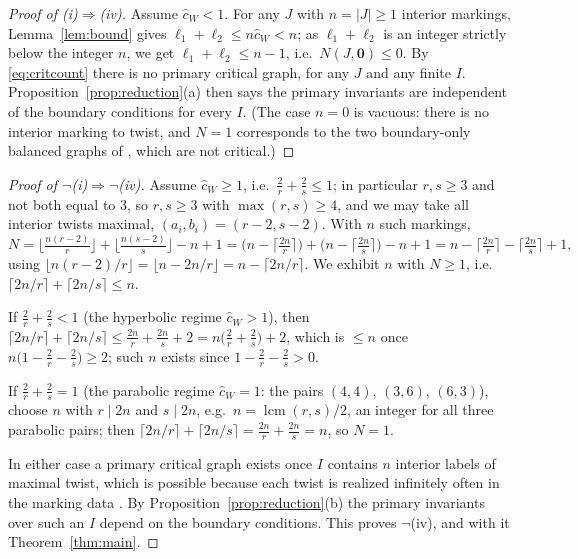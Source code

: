 \documentclass[11pt]{amsart}
\theoremstyle{definition}
\theoremstyle{remark}
\newcommand{\chat}{\hat{c}}
\begin{document}
\begin{proof}[Proof of (i)$\Rightarrow$(iv)]
Assume $\chat_{W}<1$. For any $J$ with $n=|J|\geq1$ interior markings,
Lemma~\ref{lem:bound} gives $\ell_{1}+\ell_{2}\leq n\chat_{W}<n$; as
$\ell_{1}+\ell_{2}$ is an integer strictly below the integer $n$, we get
$\ell_{1}+\ell_{2}\leq n-1$, i.e.\ $N(J,\mathbf 0)\leq0$. By
\eqref{eq:critcount} there is no primary critical graph, for any $J$ and any
finite $I$. Proposition~\ref{prop:reduction}(a) then says the primary invariants
are independent of the boundary conditions for every $I$. (The case $n=0$ is vacuous: there is no interior
marking to twist, and $N=1$ corresponds to the two boundary-only balanced graphs
of \cite[Example~3.4]{GKT}, which are not critical.)
\end{proof}

\begin{proof}[Proof of $\neg$(i)$\Rightarrow\neg$(iv)]
Assume $\chat_{W}\geq1$, i.e.\ $\frac2r+\frac2s\leq1$; in particular
$r,s\geq3$ and not both equal to $3$, so $r,s\geq3$ with $\max(r,s)\geq4$, and
we may take all interior twists maximal, $(a_{i},b_{i})=(r-2,s-2)$. With $n$ such
markings,
\begin{equation}
\label{eq:maxN}
N=\Big\lfloor\tfrac{n(r-2)}{r}\Big\rfloor+\Big\lfloor\tfrac{n(s-2)}{s}\Big\rfloor-n+1
=\Big(n-\big\lceil\tfrac{2n}{r}\big\rceil\Big)
+\Big(n-\big\lceil\tfrac{2n}{s}\big\rceil\Big)-n+1
=n-\big\lceil\tfrac{2n}{r}\big\rceil-\big\lceil\tfrac{2n}{s}\big\rceil+1,
\end{equation}
using $\lfloor n(r-2)/r\rfloor=\lfloor n-2n/r\rfloor=n-\lceil2n/r\rceil$. We
exhibit $n$ with $N\geq1$, i.e.\ $\lceil2n/r\rceil+\lceil2n/s\rceil\leq n$.

If $\frac2r+\frac2s<1$ (the hyperbolic regime $\chat_{W}>1$), then
$\lceil2n/r\rceil+\lceil2n/s\rceil\leq\frac{2n}{r}+\frac{2n}{s}+2
=n\bigl(\frac2r+\frac2s\bigr)+2$, which is $\leq n$ once
$n\bigl(1-\frac2r-\frac2s\bigr)\geq2$; such $n$ exists since
$1-\frac2r-\frac2s>0$.

If $\frac2r+\frac2s=1$ (the parabolic regime $\chat_{W}=1$: the pairs $(4,4)$,
$(3,6)$, $(6,3)$), choose $n$ with $r\mid2n$ and $s\mid2n$, e.g.\
$n=\operatorname{lcm}(r,s)/2$, an integer for all three parabolic pairs; then
$\lceil2n/r\rceil+\lceil2n/s\rceil=\frac{2n}{r}+\frac{2n}{s}=n$,
so $N=1$.

In either case a primary critical graph exists once $I$ contains $n$ interior
labels of maximal twist, which is possible because each twist is realized
infinitely often in the marking data \cite[\S2.4]{GKT}. By
Proposition~\ref{prop:reduction}(b) the primary invariants over such an $I$
depend on the boundary conditions. This proves $\neg$(iv), and with it
Theorem~\ref{thm:main}.
\end{proof}
\end{document}
